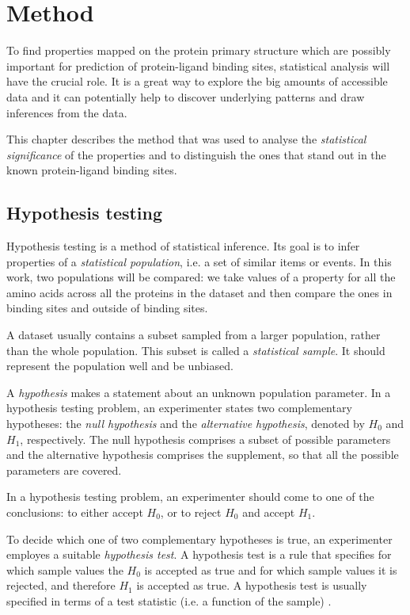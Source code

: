 
\chapter{Method}

To find properties mapped on the protein primary structure which are possibly important for prediction of protein-ligand binding sites, statistical analysis will have the crucial role. It is a great way to explore the big amounts of accessible data and it can potentially help to discover underlying patterns and draw inferences from the data.

This chapter describes the method that was used to analyse the \textit{statistical significance} of the properties and to distinguish the ones that stand out in the known protein-ligand binding sites.

\section{Hypothesis testing}

Hypothesis testing is a method of statistical inference. Its goal is to infer properties of a \textit{statistical population}, i.e. a set of similar items or events. In this work, two populations will be compared: we take values of a property for all the amino acids across all the proteins in the dataset and then compare the ones in binding sites and outside of binding sites.

A dataset usually contains a subset sampled from a larger population, rather than the whole population. This subset is called a \textit{statistical sample}. It should represent the population well and be unbiased.

A \textit{hypothesis} makes a statement about an unknown population parameter. In a hypothesis testing problem, an experimenter states two complementary hypotheses: the \textit{null hypothesis} and the \textit{alternative hypothesis}, denoted by $H_{0}$ and $H_{1}$, respectively. The null hypothesis comprises a subset of possible parameters and the alternative hypothesis comprises the supplement, so that all the possible parameters are covered.

In a hypothesis testing problem, an experimenter should come to one of the conclusions: to either accept $H_{0}$, or to reject $H_{0}$ and accept $H_{1}$.

To decide which one of two complementary hypotheses is true, an experimenter employes a suitable \textit{hypothesis test}. A hypothesis test is a rule that specifies for which sample values the $H_{0}$ is accepted as true and for which sample values it is rejected, and therefore $H_{1}$ is accepted as true. A hypothesis test is usually specified in terms of a test statistic (i.e. a function of the sample) \cite{casella}.

